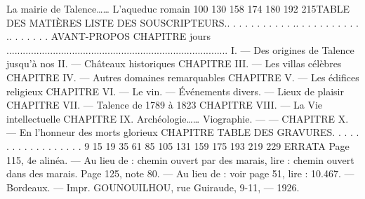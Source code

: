 \documentclass[a4paper,11pt]{book}
\begin{document}
La mairie de
Talence……
L'aqueduc romain
100
130
158
174
180
192
215TABLE DES MATIÈRES
LISTE DES SOUSCRIPTEURS.. . . . . . . . . . . .. . . . . . . . . . . .. . . . . . .
AVANT-PROPOS
CHAPITRE
jours
.................................................................................
I. — Des origines de Talence jusqu'à nos
II. — Châteaux historiques
CHAPITRE III.
— Les villas célèbres
CHAPITRE IV.
— Autres domaines remarquables
CHAPITRE
V. — Les édifices religieux
CHAPITRE VI.
— Le vin. — Événements divers. — Lieux
de plaisir
CHAPITRE VII.
— Talence de 1789 à 1823
CHAPITRE VIII. — La Vie intellectuelle
CHAPITRE IX.
Archéologie……
Viographie.
—
—
CHAPITRE
X. — En l'honneur des morts glorieux
CHAPITRE
TABLE DES GRAVURES. . . . . . . . . . . . . . . . .
.
9
15
19
35
61
85
105
131
159
175
193
219
229
ERRATA
Page 115, 4e alinéa. — Au lieu de : chemin ouvert par des marais,
lire : chemin ouvert dans des marais.
Page 125, note 80. — Au lieu de : voir page 51, lire :
10.467. — Bordeaux. — Impr. GOUNOUILHOU, rue Guiraude, 9-11,
—
1926.
\end{document}
